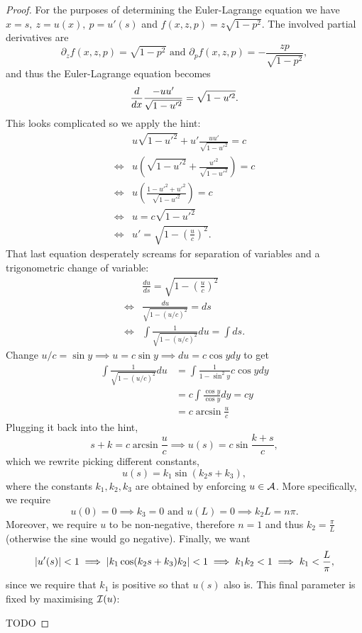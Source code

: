 \begin{proof}
  For the purposes of determining the Euler-Lagrange equation we have $x = s,\
  z = u(x),\ p = u'(s)$ and $f(x, z, p) = z\sqrt{1 - p^2}$. The involved
  partial derivatives are
  \[
    \partial_z f(x, z, p) = \sqrt{1 - p^2} \text{ and }
    \partial_p f(x, z, p) = - \frac{zp}{\sqrt{1 - p^2}},
  \]
  and thus the Euler-Lagrange equation becomes
  \[
    \frac{d}{dx} \frac{- u u'}{\sqrt{1 - u'^2}} = \sqrt{1 - u'^2}.
  \]
  This looks complicated so we apply the hint:
  \begin{align*}
    & u\sqrt{1 - u'^2} + u' \frac{uu'}{\sqrt{1 - u'^2}} = c \\
    \iff & u \left( \sqrt{1 - u'^2} + \frac{u'^2}{\sqrt{1 - u'^2}}\right) = c \\
    \iff & u \left( \frac{1 - u'^2 + u'^2}{\sqrt{1 - u'^2}}\right) = c \\
    \iff & u = c\sqrt{1 - u'^2} \\
    \iff & u' = \sqrt{1 - \left( \frac{u}{c} \right)^2}.
  \end{align*}
  That last equation desperately screams for separation of variables and a trigonometric change of variable:
  \begin{align*}
    & \frac{du}{ds} = \sqrt{1 - \left( \frac{u}{c} \right)^2} \\
    \iff &\frac{du}{\sqrt{1 - (u/c)^2}} = ds \\
    \iff & \int \frac{1}{\sqrt{1 - (u/c)^2}} du = \int ds.
  \end{align*}
  Change $u / c = \sin y \implies u = c\sin y \implies du = c\cos y dy$ to get
  \begin{align*}
    \int \frac{1}{\sqrt{1 - (u/c)^2}} du
  & = \int \frac{1}{1 - \sin^2 y} c \cos y dy \\
  &= c \int \frac{\cos y}{\cos y} dy = cy \\
  &= c\arcsin\frac{u}{c}
  \end{align*}
  Plugging it back into the hint,
  \[
    s + k = c\arcsin\frac{u}{c} \implies u(s) = c\sin \frac{k+s}{c},
  \]
  which we rewrite picking different constants,
  \[
    u(s) = k_1 \sin( k_2 s + k_3),
  \]
  where the constants $k_1, k_2, k_3$ are obtained by enforcing $u \in \mathcal{A}$.
  More specifically, we require
  \[
    u(0) = 0 \implies k_3 = 0\text{ and } u(L) = 0 \implies k_2 L = n\pi.
  \]
  Moreover, we require $u$ to be non-negative, therefore $n = 1$ and thus $k_2
  = \frac{\pi}{L}$ (otherwise the sine would go negative). Finally, we want
  \[
    \left\vert{u'(s)}\right\vert < 1 \implies \left\vert{k_1\cos(k_2s + k_3) k_2}\right\vert < 1
    \implies k_1 k_2 < 1 \implies k_1 < \frac{L}{\pi},
  \]
  since we require that $k_1$ is positive so that $u(s)$ also is. This final
  parameter is fixed by maximising $\mathcal{I}(u)$:

  TODO
\end{proof}


